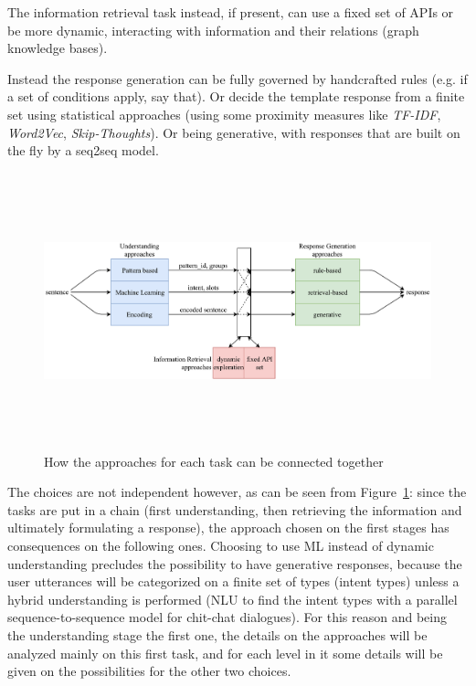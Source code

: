 The information retrieval task instead, if present, can use a fixed set of APIs or be more dynamic, interacting with information and their relations (graph knowledge bases).

Instead the response generation can be fully governed by handcrafted rules (e.g. if a set of conditions apply, say that). Or decide the template response from a finite set using statistical approaches (using some proximity measures like \textit{TF-IDF}, \textit{Word2Vec}, \textit{Skip-Thoughts}). Or being generative, with responses that are built on the fly by a seq2seq model.


\begin{figure}[!htbp]
    \centering
    \includegraphics[max width=\linewidth,max height=8cm,keepaspectratio]{figures/approachesCombination}
    \caption{How the approaches for each task can be connected together}\label{fig:approachesCombination}
\end{figure}

The choices are not independent however, as can be seen from Figure~\ref{fig:approachesCombination}: since the tasks are put in a chain (first understanding, then retrieving the information and ultimately formulating a response), the approach chosen on the first stages has consequences on the following ones. Choosing to use ML instead of dynamic understanding precludes the possibility to have generative responses, because the user utterances will be categorized on a finite set of types (intent types) unless a hybrid understanding is performed (NLU to find the intent types with a parallel sequence-to-sequence model for chit-chat dialogues). For this reason and being the understanding stage the first one, the details on the approaches will be analyzed mainly on this first task, and for each level in it some details will be given on the possibilities for the other two choices.

